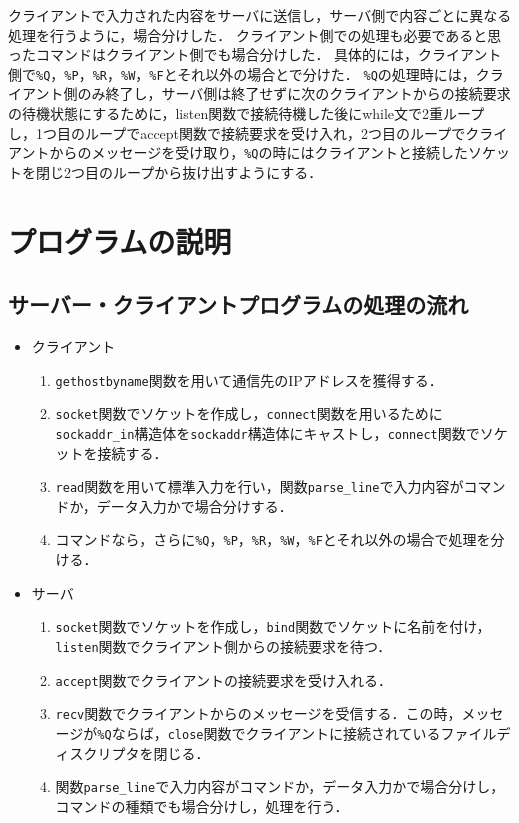 \documentclass{jarticle}[11pt]
\begin{document}
クライアントで入力された内容をサーバに送信し，サーバ側で内容ごとに異なる処理を行うように，場合分けした．
クライアント側での処理も必要であると思ったコマンドはクライアント側でも場合分けした．
具体的には，クライアント側で\verb|%Q|，\verb|%P|，\verb|%R|，\verb|%W|，\verb|%F|とそれ以外の場合とで分けた．
\verb|%Q|の処理時には，クライアント側のみ終了し，サーバ側は終了せずに次のクライアントからの接続要求の待機状態にするために，listen関数で接続待機した後にwhile文で2重ループし，1つ目のループでaccept関数で接続要求を受け入れ，2つ目のループでクライアントからのメッセージを受け取り，\verb|%Q|の時にはクライアントと接続したソケットを閉じ2つ目のループから抜け出すようにする．

    \section{プログラムの説明}
\subsection{サーバー・クライアントプログラムの処理の流れ}
\begin{itemize}
\item クライアント 
  \begin{enumerate}
  \item \verb|gethostbyname|関数を用いて通信先のIPアドレスを獲得する．
  \item \verb|socket|関数でソケットを作成し，\verb|connect|関数を用いるために\verb|sockaddr_in|構造体を\verb|sockaddr|構造体にキャストし，\verb|connect|関数でソケットを接続する．
  \item \verb|read|関数を用いて標準入力を行い，関数\verb|parse_line|で入力内容がコマンドか，データ入力かで場合分けする．
  \item コマンドなら，さらに\verb|%Q|，\verb|%P|，\verb|%R|，\verb|%W|，\verb|%F|とそれ以外の場合で処理を分ける．
  \end{enumerate}

\item サーバ
  \begin{enumerate}
  \item \verb|socket|関数でソケットを作成し，\verb|bind|関数でソケットに名前を付け，\verb|listen|関数でクライアント側からの接続要求を待つ．
  \item \verb|accept|関数でクライアントの接続要求を受け入れる．
  \item \verb|recv|関数でクライアントからのメッセージを受信する．この時，メッセージが\verb|%Q|ならば，\verb|close|関数でクライアントに接続されているファイルディスクリプタを閉じる．
  \item 関数\verb|parse_line|で入力内容がコマンドか，データ入力かで場合分けし，コマンドの種類でも場合分けし，処理を行う．
  \end{enumerate}
\end{itemize}
\end{document}
